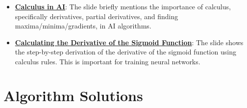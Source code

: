 \documentclass{article}%
\begin{document}
\begin{itemize}[leftmargin=*]
\item \href{https://purdue.brightspace.com/d2l/common/assets/pdfjs-d2l-dist/1.0.14-legacy/web/viewer.html?file=%2Fcontent%2Fenforced%2F1095467-wl.202510.CS.24300.001%2F04L1-Linear Algebra Primer.pdf%3Fou%3D1095467&lang=en-us&container=d2l-fileviewer-rendered-pdf&fullscreen=d2l-fileviewer-rendered-pdf-dialog&height=667#page=19}{\textbf{Calculus in AI}}: The slide briefly mentions the importance of calculus, specifically derivatives, partial derivatives, and finding maxima/minima/gradients, in AI algorithms.%
\item \href{https://purdue.brightspace.com/d2l/common/assets/pdfjs-d2l-dist/1.0.14-legacy/web/viewer.html?file=%2Fcontent%2Fenforced%2F1095467-wl.202510.CS.24300.001%2F04L1-Linear Algebra Primer.pdf%3Fou%3D1095467&lang=en-us&container=d2l-fileviewer-rendered-pdf&fullscreen=d2l-fileviewer-rendered-pdf-dialog&height=667#page=21}{\textbf{Calculating the Derivative of the Sigmoid Function}}: The slide shows the step-by-step derivation of the derivative of the sigmoid function using calculus rules. This is important for training neural networks.%
\end{itemize}

%
\section{Algorithm Solutions}%
\label{sec:AlgorithmSolutions}%
\end{document}
